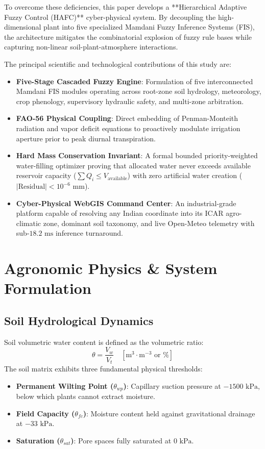 \documentclass[conference]{IEEEtran}
\begin{document}
To overcome these deficiencies, this paper develops a **Hierarchical Adaptive Fuzzy Control (HAFC)** cyber-physical system. By decoupling the high-dimensional plant into five specialized Mamdani Fuzzy Inference Systems (FIS), the architecture mitigates the combinatorial explosion of fuzzy rule bases while capturing non-linear soil-plant-atmosphere interactions.

The principal scientific and technological contributions of this study are:
\begin{itemize}
    \item \textbf{Five-Stage Cascaded Fuzzy Engine}: Formulation of five interconnected Mamdani FIS modules operating across root-zone soil hydrology, meteorology, crop phenology, supervisory hydraulic safety, and multi-zone arbitration.
    \item \textbf{FAO-56 Physical Coupling}: Direct embedding of Penman-Monteith radiation and vapor deficit equations to proactively modulate irrigation aperture prior to peak diurnal transpiration.
    \item \textbf{Hard Mass Conservation Invariant}: A formal bounded priority-weighted water-filling optimizer proving that allocated water never exceeds available reservoir capacity ($\sum Q_i \le V_{\text{available}}$) with zero artificial water creation ($|\text{Residual}| < 10^{-6}\text{ mm}$).
    \item \textbf{Cyber-Physical WebGIS Command Center}: An industrial-grade platform capable of resolving any Indian coordinate into its ICAR agro-climatic zone, dominant soil taxonomy, and live Open-Meteo telemetry with sub-$18.2\text{ ms}$ inference turnaround.
\end{itemize}

\section{Agronomic Physics \& System Formulation}

\subsection{Soil Hydrological Dynamics}
Soil volumetric water content is defined as the volumetric ratio:
\begin{equation}
\theta = \frac{V_w}{V_t} \quad [\text{m}^3\cdot\text{m}^{-3} \text{ or } \%]
\label{eq:theta}
\end{equation}
The soil matrix exhibits three fundamental physical thresholds:
\begin{itemize}
    \item \textbf{Permanent Wilting Point ($\theta_{wp}$)}: Capillary suction pressure at $-1500\text{ kPa}$, below which plants cannot extract moisture.
    \item \textbf{Field Capacity ($\theta_{fc}$)}: Moisture content held against gravitational drainage at $-33\text{ kPa}$.
    \item \textbf{Saturation ($\theta_{sat}$)}: Pore spaces fully saturated at $0\text{ kPa}$.
\end{itemize}
\end{document}
